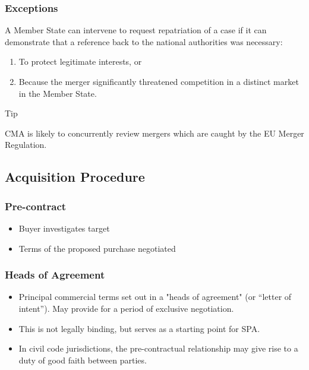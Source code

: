 \documentclass[
]{article}
\providecommand{\tightlist}{%
  \setlength{\itemsep}{0pt}\setlength{\parskip}{0pt}}
\newenvironment{env-6d07161a-ed86-42c5-9ad0-ed087f8f8b32}
{
    \savenotes\tcolorbox[blanker,breakable,left=5pt,borderline west={2pt}{-4pt}{cyan}]
}
{
    \endtcolorbox\spewnotes
}
\begin{document}
\hypertarget{exceptions}{%
\subsubsection{Exceptions}\label{exceptions}}

A Member State can intervene to request repatriation of a case if it can
demonstrate that a reference back to the national authorities was
necessary:

\begin{enumerate}
\tightlist
\item
  To protect legitimate interests, or
\item
  Because the merger significantly threatened competition in a distinct
  market in the Member State.
\end{enumerate}

\begin{env-6d07161a-ed86-42c5-9ad0-ed087f8f8b32}

Tip

CMA is likely to concurrently review mergers which are caught by the EU
Merger Regulation.

\end{env-6d07161a-ed86-42c5-9ad0-ed087f8f8b32}

\hypertarget{acquisition-procedure}{%
\subsection{Acquisition Procedure}\label{acquisition-procedure}}

\hypertarget{pre-contract}{%
\subsubsection{Pre-contract}\label{pre-contract}}

\begin{itemize}
\tightlist
\item
  Buyer investigates target
\item
  Terms of the proposed purchase negotiated
\end{itemize}

\hypertarget{heads-of-agreement}{%
\subsubsection{Heads of Agreement}\label{heads-of-agreement}}

\begin{itemize}
\tightlist
\item
  Principal commercial terms set out in a "heads of agreement" (or
  ``letter of intent''). May provide for a period of exclusive
  negotiation.
\item
  This is not legally binding, but serves as a starting point for SPA.
\item
  In civil code jurisdictions, the pre-contractual relationship may give
  rise to a duty of good faith between parties.
\end{itemize}
\end{document}

